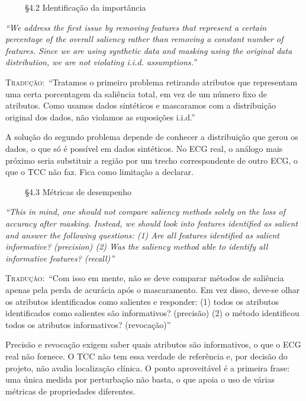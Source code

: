 \documentclass[11pt,a4paper]{article}
\newcommand{\pagechip}[1]{{\setlength{\fboxsep}{1.5pt}\colorbox{cAcc}{\textcolor{white}{\scriptsize\texttt{#1}}}}}
\newenvironment{origquote}{\par\itshape\small}{\par}
\newenvironment{tradquote}{\par\small\textsc{Tradução:}\ }{\par}
\newcommand{\explab}[1]{\par\smallskip{\small\color{cAcc}\textbf{\MakeUppercase{#1}}}\par}
\begin{document}
\begin{citacard}{\pagechip{p. 5} §4.2 Identificação da importância}
\begin{origquote}“We address the first issue by removing features that represent a certain percentage of the overall saliency rather than removing a constant number of features. Since we are using synthetic data and masking using the original data distribution, we are not violating i.i.d. assumptions.”\end{origquote}
\begin{tradquote}“Tratamos o primeiro problema retirando atributos que representam uma certa porcentagem da saliência total, em vez de um número fixo de atributos. Como usamos dados sintéticos e mascaramos com a distribuição original dos dados, não violamos as suposições i.i.d.”\end{tradquote}
\explab{Explicação}
A solução do segundo problema depende de conhecer a distribuição que gerou os dados, o que só é possível em dados sintéticos. No ECG real, o análogo mais próximo seria substituir a região por um trecho correspondente de outro ECG, o que o TCC não faz. Fica como limitação a declarar.
\end{citacard}

\begin{citacard}{\pagechip{p. 5} §4.3 Métricas de desempenho}
\begin{origquote}“This in mind, one should not compare saliency methods solely on the loss of accuracy after masking. Instead, we should look into features identified as salient and answer the following questions: (1) Are all features identified as salient informative? (precision) (2) Was the saliency method able to identify all informative features? (recall)”\end{origquote}
\begin{tradquote}“Com isso em mente, não se deve comparar métodos de saliência apenas pela perda de acurácia após o mascaramento. Em vez disso, deve-se olhar os atributos identificados como salientes e responder: (1) todos os atributos identificados como salientes são informativos? (precisão) (2) o método identificou todos os atributos informativos? (revocação)”\end{tradquote}
\explab{Explicação}
Precisão e revocação exigem saber quais atributos são informativos, o que o ECG real não fornece. O TCC não tem essa verdade de referência e, por decisão do projeto, não avalia localização clínica. O ponto aproveitável é a primeira frase: uma única medida por perturbação não basta, o que apoia o uso de várias métricas de propriedades diferentes.
\end{citacard}
\end{document}
